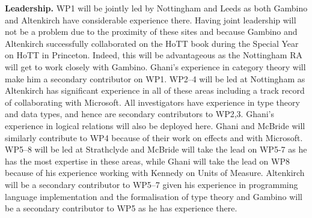\documentclass[a4paper,11pt]{article}
\begin{document}
{\bf Leadership.} WP1 will be jointly led by Nottingham and Leeds as
both Gambino and Altenkirch have considerable experience there. Having
joint leadership will not be a problem due to the proximity of these
sites and because Gambino and Altenkirch successfully collaborated on
the HoTT book during the Special Year on HoTT in Princeton. Indeed,
this will be advantageous as the Nottingham RA will get to work
closely with Gambino. Ghani's experience in category theory will make
him a secondary contributor on WP1. WP2--4 will be led at Nottingham
as Altenkirch has significant experience in all of these areas
including a track record of collaborating with Microsoft. All
investigators have experience in type theory and data types, and hence
are secondary contributors to WP2,3. Ghani's experience in logical
relations will also be deployed here. Ghani and McBride will similarly
contribute to WP4 because of their work on effects and with
Microsoft. WP5--8 will be led at Strathclyde and McBride will take the
lead on WP5-7 as he has the most expertise in these areas, while Ghani
will take the lead on WP8 because of his experience working with
Kennedy on Units of Measure. Altenkirch will be a secondary
contributor to WP5--7 given his experience in programming language
implementation and the formalisation of type theory and Gambino will
be a secondary contributor to WP5 as he has experience there.
\end{document}
